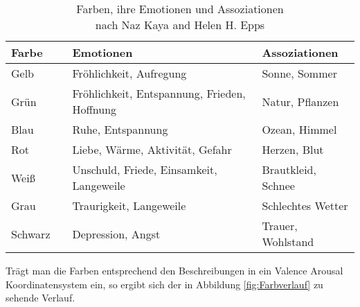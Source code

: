 \documentclass[11pt,a4paper]{article}
\begin{document}
\begin{center}
\begin{table}[!ht]
\begin{tabular}{l | l | l | l}
\textbf{Farbe} & & \textbf{Emotionen} & \textbf{Assoziationen}\\
\hline
Gelb & \cellcolor{yellow_color} & Fröhlichkeit, Aufregung & Sonne, Sommer \\
Grün & \cellcolor{green_color} & Fröhlichkeit, Entspannung, Frieden, Hoffnung & Natur, Pflanzen \\
Blau & \cellcolor{blue_color} & Ruhe, Entspannung & Ozean, Himmel \\
Rot & \cellcolor{red_color} & Liebe, Wärme, Aktivität, Gefahr & Herzen, Blut \\
Weiß & \cellcolor{white_color} & Unschuld, Friede, Einsamkeit, Langeweile & Brautkleid, Schnee \\
Grau & \cellcolor{gray_color} & Traurigkeit, Langeweile & Schlechtes Wetter \\
Schwarz & \cellcolor{black_color} & Depression, Angst & Trauer, Wohlstand \\

\end{tabular}
\captionsetup{justification=centering}
\caption[Farben Emotionen Assoziationen]{Farben, ihre Emotionen und Assoziationen\\nach Naz Kaya and Helen H. Epps
 \cite{c0f471f7e6a618d880cf25175c9f99ac97ef8ba7d016c7f8c523f8d902892d9e}}
\label{tab:ColorEmotions}

\end{table}
\end{center}
Trägt man die Farben entsprechend den Beschreibungen in ein Valence Arousal Koordinatensystem ein, so ergibt sich der in Abbildung \ref{fig:Farbverlauf} zu sehende Verlauf.
\end{document}
